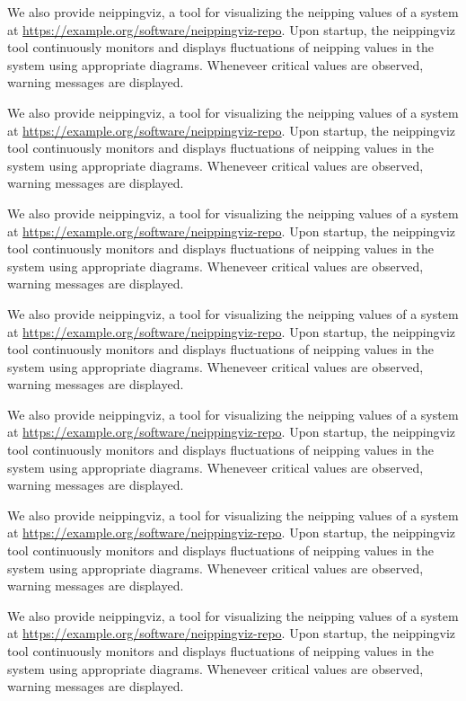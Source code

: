 We also provide neippingviz, a tool for visualizing the neipping values of a system at \url{https://example.org/software/neippingviz-repo}. Upon startup, the neippingviz tool continuously monitors and displays fluctuations of neipping values in the system using appropriate diagrams. Wheneveer critical values are observed, warning messages are displayed.

We also provide neippingviz, a tool for visualizing the neipping values of a system at \url{https://example.org/software/neippingviz-repo}. Upon startup, the neippingviz tool continuously monitors and displays fluctuations of neipping values in the system using appropriate diagrams. Wheneveer critical values are observed, warning messages are displayed.

We also provide neippingviz, a tool for visualizing the neipping values of a system at \url{https://example.org/software/neippingviz-repo}. Upon startup, the neippingviz tool continuously monitors and displays fluctuations of neipping values in the system using appropriate diagrams. Wheneveer critical values are observed, warning messages are displayed.

We also provide neippingviz, a tool for visualizing the neipping values of a system at \url{https://example.org/software/neippingviz-repo}. Upon startup, the neippingviz tool continuously monitors and displays fluctuations of neipping values in the system using appropriate diagrams. Wheneveer critical values are observed, warning messages are displayed.

We also provide neippingviz, a tool for visualizing the neipping values of a system at \url{https://example.org/software/neippingviz-repo}. Upon startup, the neippingviz tool continuously monitors and displays fluctuations of neipping values in the system using appropriate diagrams. Wheneveer critical values are observed, warning messages are displayed.

We also provide neippingviz, a tool for visualizing the neipping values of a system at \url{https://example.org/software/neippingviz-repo}. Upon startup, the neippingviz tool continuously monitors and displays fluctuations of neipping values in the system using appropriate diagrams. Wheneveer critical values are observed, warning messages are displayed.

We also provide neippingviz, a tool for visualizing the neipping values of a system at \url{https://example.org/software/neippingviz-repo}. Upon startup, the neippingviz tool continuously monitors and displays fluctuations of neipping values in the system using appropriate diagrams. Wheneveer critical values are observed, warning messages are displayed.

